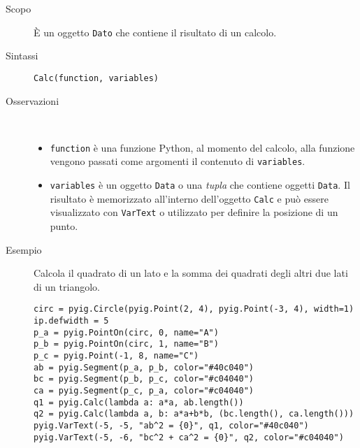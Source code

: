 \begin{description}
 \item [Scopo] È un oggetto \lstinline{Dato} che contiene il risultato di un 
calcolo.
 \item [Sintassi] \lstinline{Calc(function, variables)}
 \item [Osservazioni]  ~\\
\begin{itemize} [nosep]
\item \lstinline{function} è una funzione Python, al momento del calcolo, alla
funzione vengono passati come argomenti il contenuto di \lstinline{variables}.
\item \lstinline{variables} è un oggetto \lstinline{Data} o una \emph{tupla} 
che contiene oggetti \lstinline{Data}. 
Il risultato è memorizzato all'interno dell'oggetto \lstinline{Calc} e può
essere visualizzato con \lstinline{VarText} o utilizzato per definire la 
posizione di un punto.
\end{itemize}

 \item [Esempio] Calcola il quadrato di un lato e la somma dei quadrati degli 
altri due lati di
un triangolo.

\begin{lstlisting}
circ = pyig.Circle(pyig.Point(2, 4), pyig.Point(-3, 4), width=1)
ip.defwidth = 5
p_a = pyig.PointOn(circ, 0, name="A")
p_b = pyig.PointOn(circ, 1, name="B")
p_c = pyig.Point(-1, 8, name="C")
ab = pyig.Segment(p_a, p_b, color="#40c040")
bc = pyig.Segment(p_b, p_c, color="#c04040")
ca = pyig.Segment(p_c, p_a, color="#c04040")
q1 = pyig.Calc(lambda a: a*a, ab.length())
q2 = pyig.Calc(lambda a, b: a*a+b*b, (bc.length(), ca.length()))
pyig.VarText(-5, -5, "ab^2 = {0}", q1, color="#40c040")
pyig.VarText(-5, -6, "bc^2 + ca^2 = {0}", q2, color="#c04040")
\end{lstlisting}

\end{description}


